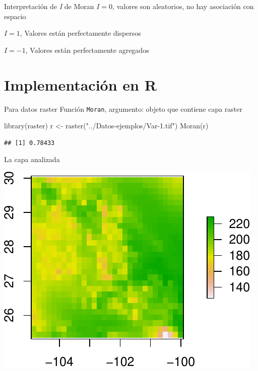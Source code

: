 \documentclass[
  11pt,
  ignorenonframetext,
]{beamer}
\newenvironment{Shaded}{}{}
\newcommand{\FunctionTok}[1]{\textcolor[rgb]{0.02,0.16,0.49}{#1}}
\newcommand{\NormalTok}[1]{#1}
\newcommand{\OtherTok}[1]{\textcolor[rgb]{0.00,0.44,0.13}{#1}}
\newcommand{\StringTok}[1]{\textcolor[rgb]{0.25,0.44,0.63}{#1}}
\begin{document}
\begin{frame}{Interpretación de \emph{I} de Moran}
\protect\hypertarget{interpretaciuxf3n-de-i-de-moran}{}
\(I = 0\), valores son aleatorios, no hay asociación con espacio

\(I = 1\), Valores están perfectamente dispersos

\(I=-1\), Valores están perfectamente agregados
\end{frame}

\hypertarget{implementaciuxf3n-en-r}{%
\section{\texorpdfstring{Implementación en
\textbf{R}}{Implementación en R}}\label{implementaciuxf3n-en-r}}

\begin{frame}[fragile]{Para datos raster}
\protect\hypertarget{para-datos-raster}{}
Función \texttt{Moran}, argumento: objeto que contiene capa raster

\begin{Shaded}
\begin{Highlighting}[]
\FunctionTok{library}\NormalTok{(raster)}
\NormalTok{r }\OtherTok{\textless{}{-}} \FunctionTok{raster}\NormalTok{(}\StringTok{"../Datos{-}ejemplos/Var{-}1.tif"}\NormalTok{)}
\FunctionTok{Moran}\NormalTok{(r)}
\end{Highlighting}
\end{Shaded}

\begin{verbatim}
## [1] 0.78433
\end{verbatim}
\end{frame}

\begin{frame}{La capa analizada}
\protect\hypertarget{la-capa-analizada}{}
\begin{center}\includegraphics{Asociacion-espacio_files/figure-beamer/unnamed-chunk-2-1} \end{center}
\end{frame}
\end{document}
